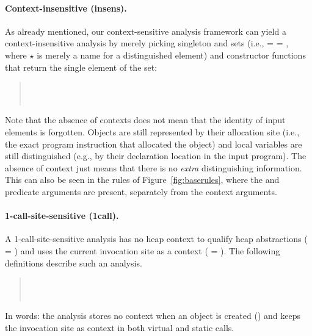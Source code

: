 \paragraph{Context-insensitive (insens).}
As already mentioned, our context-sensitive analysis framework can
yield a context-insensitive analysis by merely picking singleton
 and  sets (i.e.,  =  =
\args{\{$\star$\}}, where $\star$ is merely a name for a distinguished
element) and constructor functions that return the single element of
the set:
\begin{quote}
\\
 \\
\end{quote}

\noindent Note that the absence of contexts does not mean that the
identity of input elements is forgotten. Objects are still represented
by their allocation site (i.e., the exact program instruction that
allocated the object) and local variables are still distinguished
(e.g., by their declaration location in the input program). The
absence of context just means that there is no \emph{extra}
distinguishing information. This can also be seen in the rules of
Figure~\ref{fig:baserules}, where the  and 
predicate arguments are present, separately from the context
arguments.

\paragraph{1-call-site-sensitive (1call).}
A 1-call-site-sensitive analysis has no heap context to qualify heap
abstractions ( = \args{\{$\star$\}}) and uses the current
invocation site as a context ( = ). The following
definitions describe such an analysis.
\begin{quote}
 \\
 \\
\end{quote}
In words: the analysis stores no context when an object is created
() and keeps the invocation site as context in
both virtual and static calls.


